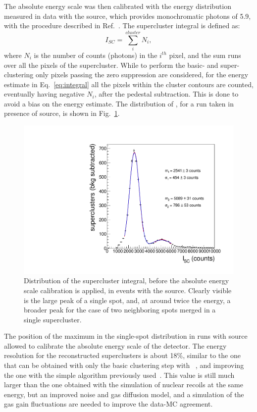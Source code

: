 The absolute energy scale was then calibrated with the energy distribution
measured in data with the \fe source, which provides monochromatic
photons of 5.9\keV, with the procedure described in
Ref.~\cite{bib:fe55}. The supercluster integral is defined as:
\begin{equation}
\label{eq:integral}
I_{SC} = \sum_i^{cluster} N_i,
\end{equation}
where $N_i$ is the number of counts (photons) in the $i^{th}$ pixel,
and the sum runs over all the pixels of the supercluster.  While to
perform the basic- and super-clustering only pixels passing the zero
suppression are considered, for the energy estimate in
Eq.~\ref{eq:integral} all the pixels within the cluster contours are
counted, eventually having negative $N_i$, after the pedestal
subtraction. This is done to avoid a bias on the energy estimate.
The distribution of \isclu, for a run taken in presence of \fe source,
is shown in Fig.~\ref{fig:feuncalibpeak}.
%
\begin{figure}[ht]
  \begin{center}
    \includegraphics[width=0.49\linewidth]{figures/fe_ucalibintegral_fit}
    \caption{Distribution of the supercluster integral, before the
      absolute energy scale calibration is applied, in events with the
      \fe source. Clearly visible is the large peak of a single spot,
      and, at around twice the energy, a broader peak for the case of
      two neighboring spots merged in a single supercluster.
      \label{fig:feuncalibpeak}}
  \end{center}
\end{figure}
%
 The position of the maximum in the single-spot distribution in runs
with \fe source allowed to calibrate the absolute energy scale of
the \lemon detector.  The energy resolution for the reconstructed \gac
superclusters is about 18\%, similar to the one that can be obtained
with only the basic clustering step with \idbscan~\cite{iDBSCAN}, and
improving the one with the simple \nnc algorithm previously
used~\cite{bib:fe55}. This value is still much larger than the one
obtained with the simulation of nuclear recoils at the same energy,
but an improved noise and gas diffusion model, and a simulation of the
gas gain fluctuations are needed to improve the data-MC agreement.


